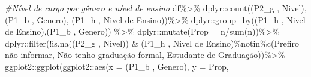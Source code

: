 \documentclass[
]{article}
\newenvironment{Shaded}{\begin{snugshade}}{\end{snugshade}}
\newcommand{\AttributeTok}[1]{\textcolor[rgb]{0.77,0.63,0.00}{#1}}
\newcommand{\CommentTok}[1]{\textcolor[rgb]{0.56,0.35,0.01}{\textit{#1}}}
\newcommand{\FunctionTok}[1]{\textcolor[rgb]{0.00,0.00,0.00}{#1}}
\newcommand{\NormalTok}[1]{#1}
\newcommand{\SpecialCharTok}[1]{\textcolor[rgb]{0.00,0.00,0.00}{#1}}
\newcommand{\StringTok}[1]{\textcolor[rgb]{0.31,0.60,0.02}{#1}}
\begin{document}
\begin{Shaded}
\begin{Highlighting}[]
\CommentTok{\#Nível de cargo por gênero e nível de ensino}
\NormalTok{df}\SpecialCharTok{\%\textgreater{}\%}
\NormalTok{       dplyr}\SpecialCharTok{::}\FunctionTok{count}\NormalTok{(}\StringTok{\textasciigrave{}}\AttributeTok{(\textquotesingle{}P2\_g \textquotesingle{}, \textquotesingle{}Nivel\textquotesingle{})}\StringTok{\textasciigrave{}}\NormalTok{,}\StringTok{\textasciigrave{}}\AttributeTok{(\textquotesingle{}P1\_b \textquotesingle{}, \textquotesingle{}Genero\textquotesingle{})}\StringTok{\textasciigrave{}}\NormalTok{,}
                    \StringTok{\textasciigrave{}}\AttributeTok{(\textquotesingle{}P1\_h \textquotesingle{}, \textquotesingle{}Nivel de Ensino\textquotesingle{})}\StringTok{\textasciigrave{}}\NormalTok{)}\SpecialCharTok{\%\textgreater{}\%}
\NormalTok{  dplyr}\SpecialCharTok{::}\FunctionTok{group\_by}\NormalTok{(}\StringTok{\textasciigrave{}}\AttributeTok{(\textquotesingle{}P1\_h \textquotesingle{}, \textquotesingle{}Nivel de Ensino\textquotesingle{})}\StringTok{\textasciigrave{}}\NormalTok{,}\StringTok{\textasciigrave{}}\AttributeTok{(\textquotesingle{}P1\_b \textquotesingle{}, \textquotesingle{}Genero\textquotesingle{})}\StringTok{\textasciigrave{}}\NormalTok{) }\SpecialCharTok{\%\textgreater{}\%}
\NormalTok{  dplyr}\SpecialCharTok{::}\FunctionTok{mutate}\NormalTok{(}\AttributeTok{Prop =}\NormalTok{ n}\SpecialCharTok{/}\FunctionTok{sum}\NormalTok{(n))}\SpecialCharTok{\%\textgreater{}\%}
\NormalTok{  dplyr}\SpecialCharTok{::}\FunctionTok{filter}\NormalTok{(}\SpecialCharTok{!}\FunctionTok{is.na}\NormalTok{(}\StringTok{\textasciigrave{}}\AttributeTok{(\textquotesingle{}P2\_g \textquotesingle{}, \textquotesingle{}Nivel\textquotesingle{})}\StringTok{\textasciigrave{}}\NormalTok{) }\SpecialCharTok{\&}
                  \StringTok{\textasciigrave{}}\AttributeTok{(\textquotesingle{}P1\_h \textquotesingle{}, \textquotesingle{}Nivel de Ensino\textquotesingle{})}\StringTok{\textasciigrave{}}\SpecialCharTok{\%notin\%}\FunctionTok{c}\NormalTok{(}\StringTok{\textquotesingle{}Prefiro não informar\textquotesingle{}}\NormalTok{, }\StringTok{\textquotesingle{}Não tenho graduação formal\textquotesingle{}}\NormalTok{, }\StringTok{\textquotesingle{}Estudante de Graduação\textquotesingle{}}\NormalTok{))}\SpecialCharTok{\%\textgreater{}\%}
\NormalTok{  ggplot2}\SpecialCharTok{::}\FunctionTok{ggplot}\NormalTok{(ggplot2}\SpecialCharTok{::}\FunctionTok{aes}\NormalTok{(}\AttributeTok{x =} \StringTok{\textasciigrave{}}\AttributeTok{(\textquotesingle{}P1\_b \textquotesingle{}, \textquotesingle{}Genero\textquotesingle{})}\StringTok{\textasciigrave{}}\NormalTok{, }\AttributeTok{y =}\NormalTok{ Prop,}

\end{Highlighting}
\end{Shaded}
\end{document}
